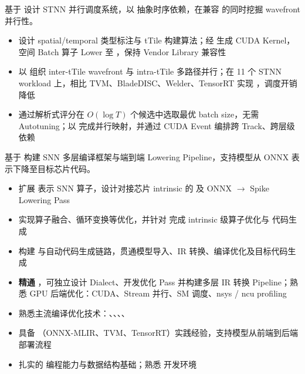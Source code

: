 

基于  设计 STNN 并行调度系统，以  抽象时序依赖，在兼容  的同时挖掘 wavefront 并行性。

\begin{itemize}
  \item 设计 spatial/temporal 类型标注与 tTile 构建算法；经  生成 CUDA Kernel，空间 Batch 算子 Lower 至 ，保持 Vendor Library 兼容性
  \item 以 组织 inter-tTile wavefront 与 intra-tTile 多路径并行；在 11 个 STNN workload 上，相比 TVM、BladeDISC、Welder、TensorRT 实现 ，调度开销降低 
  \item 通过解析式评分在 $O(\log T)$ 个候选中选取最优 batch size，无需 Autotuning；以  完成并行映射，并通过 CUDA Event 编排跨 Track、跨层级依赖
\end{itemize}

基于  构建 SNN 多层编译框架与端到端 Lowering Pipeline，支持模型从 ONNX 表示下降至目标芯片代码。

\begin{itemize}
  \item 扩展  表示 SNN 算子，设计对接芯片 intrinsic 的  及 ONNX $\to$ Spike Lowering Pass
  \item 实现算子融合、循环变换等优化，并针对  完成 intrinsic 级算子优化与  代码生成
  \item 构建 与自动代码生成链路，贯通模型导入、IR 转换、编译优化及目标代码生成
\end{itemize}


\begin{itemize}[parsep=0.5ex]
  \item \textbf{精通} ，可独立设计 Dialect、开发优化 Pass 并构建多层 IR 转换 Pipeline；熟悉 GPU 后端优化：CUDA、Stream 并行、SM 调度、nsys / ncu profiling
  \item 熟悉主流编译优化技术：、、、、
  \item 具备 （ONNX-MLIR、TVM、TensorRT）实践经验，支持模型从前端到后端部署流程
  \item 扎实的  编程能力与数据结构基础；熟悉  开发环境
\end{itemize}


